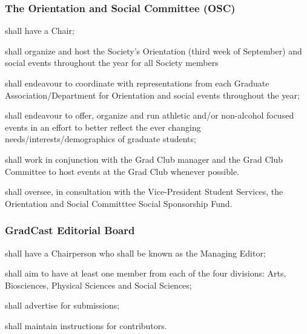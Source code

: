 \subsubsection{The Orientation and Social Committee (OSC)}
\begin{longenum}[ label*=\thesubsubsection.\arabic*., align=left]
	\item shall have a Chair;
    \item  shall organize and host the Society's Orientation (third week of September) and social events throughout the year for all Society members
    \item  shall endeavour to coordinate with representations from each Graduate Association/Department for Orientation and social events throughout the year;
    \item  shall endeavour to offer, organize and run athletic and/or non-alcohol focused events in an effort to better reflect the ever changing needs/interests/demographics of graduate students; 
    \item shall work in conjunction with the Grad Club manager and the Grad Club Committee to host events at the Grad Club whenever possible.
    \item shall oversee, in consultation with the Vice-President Student Services, the Orientation and Social Committtee Social
Sponsorship Fund.

\end{longenum}
 
\subsubsection{GradCast  Editorial Board}
\begin{longenum}[ label*=\thesubsubsection.\arabic*., align=left]
	\item  shall have a Chairperson who shall be known as the Managing Editor;
    \item shall aim to have at least one member from each of the four divisions: Arts, Biosciences, Physical Sciences and Social Sciences;
    \item shall advertise for submissions;
    \item shall maintain instructions for contributors.
\end{longenum}
 
